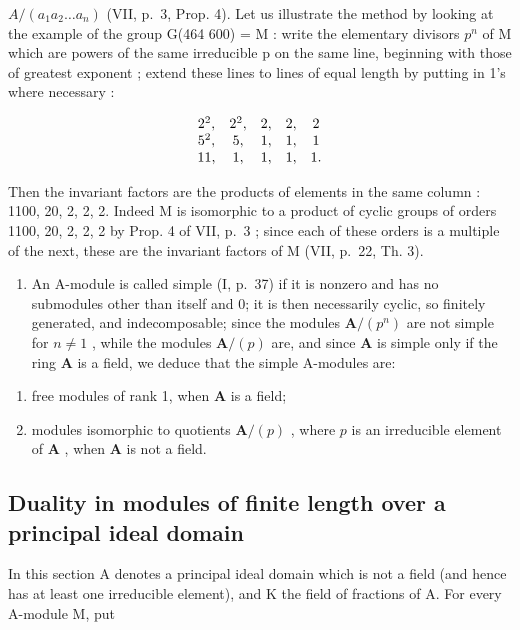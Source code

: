\(A/(a_{1}a_{2}\ldots a_{n})\) (VII, p.~3, Prop. 4). Let us illustrate the method by looking at the example of the group G(464 600) = M : write the elementary divisors \(p^{n}\) of M which are powers of the same irreducible p on the same line, beginning with those of greatest exponent ; extend these lines to lines of equal length by putting in 1's where necessary :

\[
\begin{array}{c c c c c} 2 ^ {2}, & 2 ^ {2}, & 2, & 2, & 2 \\ 5 ^ {2}, & 5, & 1, & 1, & 1 \\ 11, & 1, & 1, & 1, & 1. \end{array}
\]

Then the invariant factors are the products of elements in the same column : 1100, 20, 2, 2, 2. Indeed M is isomorphic to a product of cyclic groups of orders 1100, 20, 2, 2, 2 by Prop. 4 of VII, p.~3 ; since each of these orders is a multiple of the next, these are the invariant factors of M (VII, p.~22, Th. 3).

\begin{enumerate}
\def\labelenumi{\arabic{enumi})}
\setcounter{enumi}{3}
\tightlist
\item
  An A-module is called simple (I, p.~37) if it is nonzero and has no submodules other than itself and 0; it is then necessarily cyclic, so finitely generated, and indecomposable; since the modules \(\mathbf{A} / (p^n)\) are not simple for \(n \neq 1\) , while the modules \(\mathbf{A} / (p)\) are, and since \(\mathbf{A}\) is simple only if the ring \(\mathbf{A}\) is a field, we deduce that the simple A-modules are:
\end{enumerate}

\begin{enumerate}
\def\labelenumi{\alph{enumi})}
\item
  free modules of rank 1, when \(\mathbf{A}\) is a field;
\item
  modules isomorphic to quotients \(\mathbf{A} / (p)\) , where \(p\) is an irreducible element of \(\mathbf{A}\) , when \(\mathbf{A}\) is not a field.
\end{enumerate}

\subsection{Duality in modules of finite length over a principal ideal domain}

In this section A denotes a principal ideal domain which is not a field (and hence has at least one irreducible element), and K the field of fractions of A. For every A-module M, put

